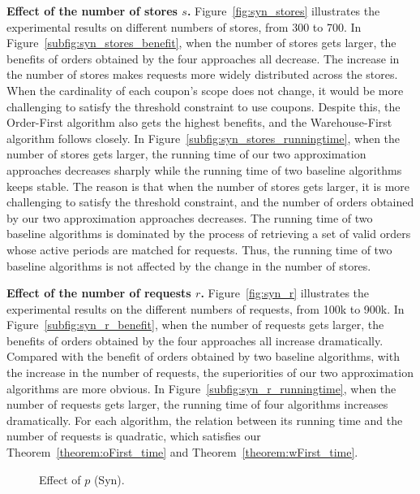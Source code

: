 \textbf{Effect of the number of stores $s$.} Figure~\ref{fig:syn_stores} illustrates the experimental results on different numbers of stores, from 300 to 700. In Figure~\ref{subfig:syn_stores_benefit}, when the number of stores gets larger, the benefits of orders obtained by the four approaches all decrease. The increase in the number of stores makes requests more widely distributed across the stores. When the cardinality of each coupon's scope does not change, it would be more challenging to satisfy the threshold constraint to use coupons. Despite this, the Order-First algorithm also gets the highest benefits, and the Warehouse-First algorithm follows closely. In Figure~\ref{subfig:syn_stores_runningtime}, when the number of stores gets larger, the running time of our two approximation approaches decreases sharply while the running time of two baseline algorithms keeps stable. The reason is that when the number of stores gets larger, it is more challenging to satisfy the threshold constraint, and the number of orders obtained by our two approximation approaches decreases. The running time of two baseline algorithms is dominated by the process of retrieving a set of valid orders whose active periods are matched for requests. Thus, the running time of two baseline algorithms is not affected by the change in the number of stores.



\textbf{Effect of the number of requests $r$.} Figure~\ref{fig:syn_r} illustrates the experimental results on the different numbers of requests, from 100k to 900k. In Figure~\ref{subfig:syn_r_benefit}, when the number of requests gets larger, the benefits of orders obtained by the four approaches all increase dramatically. Compared with the benefit of orders obtained by two baseline algorithms, with the increase in the number of requests, the superiorities of our two approximation algorithms are more obvious. In Figure~\ref{subfig:syn_r_runningtime}, when the number of requests gets larger, the running time of four algorithms increases dramatically. For each algorithm, the relation between its running time and the number of requests is quadratic, which satisfies our Theorem~\ref{theorem:oFirst_time} and Theorem~\ref{theorem:wFirst_time}.

\iffalse

\begin{figure}[t!]\centering 
	\subfigcapskip=-5pt
	\vspace{-2ex}
	\addtocounter{subfigure}{-1}
	\figureCaptionMargin
	\caption{\small Effect of $p$ (Syn).}\figureBelowMargin
	\label{fig:syn_p}
\end{figure}

